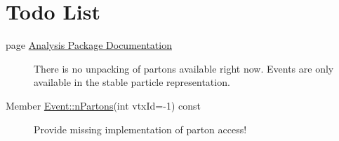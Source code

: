 \hypertarget{todo}{}\section{Todo List}\label{todo}
\label{todo__todo000004}
\hypertarget{todo__todo000004}{}
 \begin{description}
\item[page \hyperlink{index}{Analysis Package Documentation} ]There is no unpacking of partons available right now. Events are only available in the stable particle representation. \end{description}


\label{todo__todo000003}
\hypertarget{todo__todo000003}{}
 \begin{description}
\item[Member \hyperlink{classEvent_96a2728447b5b15b31e9ca132f8f4eab}{Event::n\-Partons}(int vtx\-Id=-1) const  ]Provide missing implementation of parton access! \end{description}
